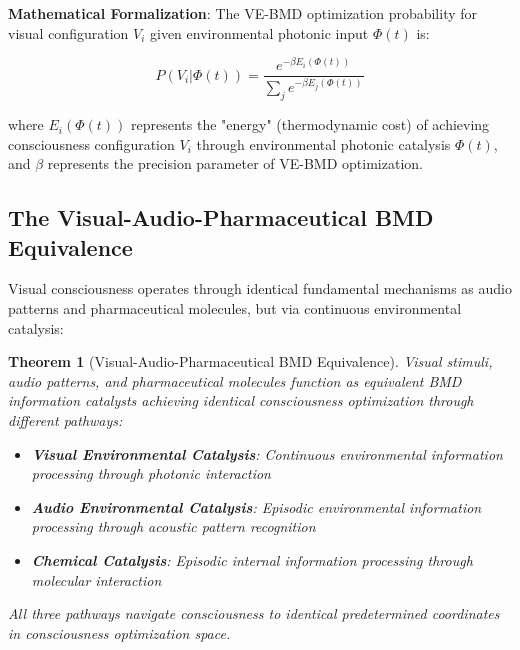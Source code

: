 \documentclass[12pt,a4paper]{article}
\newtheorem{theorem}{Theorem}[section]
\begin{document}
\textbf{Mathematical Formalization}:
The VE-BMD optimization probability for visual configuration $V_i$ given environmental photonic input $\Phi(t)$ is:

$$P(V_i | \Phi(t)) = \frac{e^{-\beta E_i(\Phi(t))}}{\sum_j e^{-\beta E_j(\Phi(t))}}$$

where $E_i(\Phi(t))$ represents the "energy" (thermodynamic cost) of achieving consciousness configuration $V_i$ through environmental photonic catalysis $\Phi(t)$, and $\beta$ represents the precision parameter of VE-BMD optimization.

\subsection{The Visual-Audio-Pharmaceutical BMD Equivalence}

Visual consciousness operates through identical fundamental mechanisms as audio patterns and pharmaceutical molecules, but via continuous environmental catalysis:

\begin{theorem}[Visual-Audio-Pharmaceutical BMD Equivalence]
Visual stimuli, audio patterns, and pharmaceutical molecules function as equivalent BMD information catalysts achieving identical consciousness optimization through different pathways:
\begin{itemize}
\item \textbf{Visual Environmental Catalysis}: Continuous environmental information processing through photonic interaction
\item \textbf{Audio Environmental Catalysis}: Episodic environmental information processing through acoustic pattern recognition
\item \textbf{Chemical Catalysis}: Episodic internal information processing through molecular interaction
\end{itemize}
All three pathways navigate consciousness to identical predetermined coordinates in consciousness optimization space.
\end{theorem}
\end{document}
